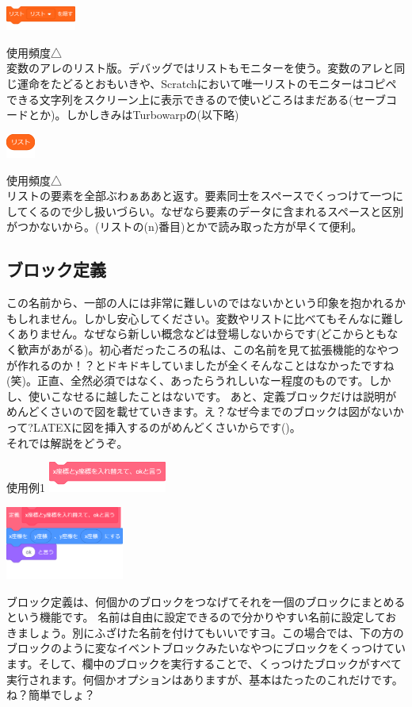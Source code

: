 \documentclass[b5paper,10pt]{jsarticle}
\begin{document}
\begin{multicols*}{3}
\begin{itembox}{10}
\includegraphics[height=8mm]{images/lists_11.png}
\end{itembox}
使用頻度△\\
変数のアレのリスト版。デバッグではリストもモニターを使う。変数のアレと同じ運命をたどるとおもいきや、Scratchにおいて唯一リストのモニターはコピペできる文字列をスクリーン上に表示できるので使いどころはまだある(セーブコードとか)。しかしきみはTurbowarpの(以下略)
\begin{itembox}{11}
\includegraphics[height=8mm]{images/lists_12.png}
\end{itembox}
使用頻度△\\
リストの要素を全部ぶわぁああと返す。要素同士をスペースでくっつけて一つにしてくるので少し扱いづらい。なぜなら要素のデータに含まれるスペースと区別がつかないから。(リストの(n)番目)とかで読み取った方が早くて便利。

\subsection{ブロック定義}
この名前から、一部の人には非常に難しいのではないかという印象を抱かれるかもしれません。しかし安心してください。変数やリストに比べてもそんなに難しくありません。なぜなら新しい概念などは登場しないからです(どこからともなく歓声があがる)。初心者だったころの私は、この名前を見て拡張機能的なやつが作れるのか！？とドキドキしていましたが全くそんなことはなかったですね(笑)。正直、全然必須ではなく、あったらうれしいなー程度のものです。しかし、使いこなせるに越したことはないです。
あと、定義ブロックだけは説明がめんどくさいので図を載せていきます。え？なぜ今までのブロックは図がないかって?LATEXに図を挿入するのがめんどくさいからです()。\\

それでは解説をどうぞ。
\begin{itembox}{使用例1}
\includegraphics[width=39mm]{images/teigi_1.png}

\includegraphics[width=39mm]{images/teigi_2.png}
\end{itembox}
ブロック定義は、何個かのブロックをつなげてそれを一個のブロックにまとめるという機能です。
名前は自由に設定できるので分かりやすい名前に設定しておきましょう。別にふざけた名前を付けてもいいですヨ。この場合では、下の方のブロックのように変なイベントブロックみたいなやつにブロックをくっつけています。そして、欄中のブロックを実行することで、くっつけたブロックがすべて実行されます。何個かオプションはありますが、基本はたったのこれだけです。ね？簡単でしょ？


\end{multicols*}
\end{document}
